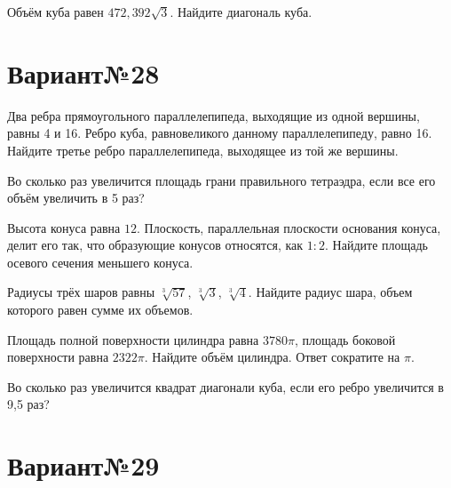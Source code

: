 \documentclass[4apaper]{article}
\begin{document}
\begin{taskBN}{6}
Объём куба равен $472,392\sqrt{3}$. Найдите диагональ куба.
\end{taskBN}
\newpage\section*{Вариант№28}

\begin{taskBN}{1}
Два ребра прямоугольного параллелепипеда, выходящие из одной вершины, равны 4 и 16. Ребро куба, равновеликого данному параллелепипеду, равно 16. Найдите третье ребро параллелепипеда, выходящее из той же вершины.
\end{taskBN}

\begin{taskBN}{2}
Во сколько раз увеличится площадь грани правильного тетраэдра, если все его объём увеличить в 5 раз?
\end{taskBN}

\begin{taskBN}{3}
Высота конуса равна $12$. Плоскость, параллельная плоскости основания конуса,  делит его так, что образующие конусов относятся, как $1:2$. Найдите площадь осевого сечения меньшего конуса. 
\end{taskBN}

\begin{taskBN}{4}
Радиусы трёх шаров равны $\sqrt[3]{57}$, $\sqrt[3]{3}$, $\sqrt[3]{4}$. Найдите радиус шара, объем которого равен сумме их объемов.
\end{taskBN}

\begin{taskBN}{5}
Площадь полной поверхности цилиндра равна $3780\pi$, площадь боковой поверхности равна $2322\pi$. Найдите объём цилиндра. Ответ сократите на $\pi$.
\end{taskBN}

\begin{taskBN}{6}
Во сколько раз увеличится квадрат диагонали куба, если его ребро увеличится в 9,5 раз?
\end{taskBN}
\newpage\section*{Вариант№29}
\end{document}
